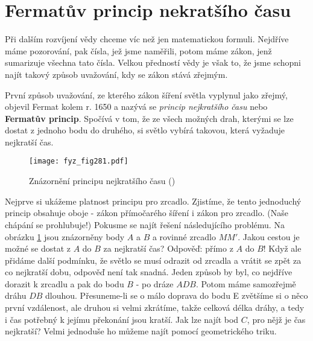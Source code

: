 {  \section{Fermatův princip nekratšího času}\label{fyz:IchapXXVIsecIII}
    Při dalším rozvíjení vědy chceme víc než jen matematickou formuli. Nejdříve máme pozorování, 
    pak čísla, jež jsme naměřili, potom máme zákon, jenž sumarizuje všechna tato čísla. Velkou 
    předností vědy je však to, že jsme schopni najít takový způsob uvažování, kdy se zákon stává 
    zřejmým. 
    
    První způsob uvažování, ze kterého zákon šíření světla vyplynul jako zřejmý, objevil Fermat 
    kolem r. 1650 a nazývá se \emph{princip nejkratšího času} nebo \textbf{Fermatův princip}. 
    Spočívá v tom, že ze všech možných drah, kterými se lze dostat z jednoho bodu do druhého, si 
    světlo vybírá takovou, která vyžaduje nejkratší čas. 

    \begin{figure}[ht!] %
      \centering
      \texttt{[image: fyz\_fig281.pdf]}
      \caption{Znázornění principu nejkratšího času
               (\cite[s.~348]{Feynman01})}
      \label{fyz:fig281}
    \end{figure}
    
    Nejprve si ukážeme platnost principu pro zrcadlo. Zjistíme, že tento jednoduchý princip 
    obsahuje oboje - zákon přímočarého šíření i zákon pro zrcadlo. (Naše chápání se prohlubuje!) 
    Pokusme se najít řešení následujícího problému. Na obrázku \ref{fyz:fig281} jsou znázorněny 
    body \(A\) a \(B\) a rovinné zrcadlo \(MM'\). Jakou cestou je možné se dostat z \(A\) do \(B\) 
    za nejkratší čas? Odpověď: přímo z \(A\) do \(B\)! Když ale přidáme další podmínku, že světlo 
    se musí odrazit od zrcadla a vrátit se zpět za co nejkratší dobu, odpověď není tak snadná. 
    Jeden způsob by byl, co nejdříve dorazit k zrcadlu a pak do bodu \(B\) - po dráze \(ADB\). 
    Potom máme samozřejmě dráhu \(DB\) dlouhou. Přesuneme-li se o málo doprava do bodu E zvětšíme 
    si o něco první vzdálenost, ale druhou si velmi zkrátíme, takže celková délka dráhy, a tedy i 
    čas potřebný k jejímu překonání jsou kratší. Jak lze najít bod \(C\), pro nějž je čas 
    nejkratší? Velmi jednoduše ho můžeme najít pomocí geometrického triku.
    
}
